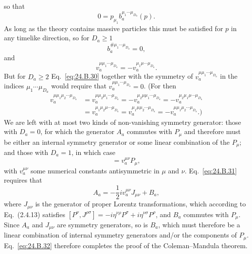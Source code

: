 so that
\begin{equation}
 0=p_{\mu_1}b_a^{\mu_1\cdots\mu_{D_a}}(p).
\tag{24.B.28}\label{eq:24.B.28}
\end{equation}
As long as the theory contains massive particles this must be satisfied for
$p$ in any timelike direction, so for $D_a\geq1$
\begin{equation}
 b_a^{\#\mu_1\cdots\mu_{D_a}}=0,
\tag{24.B.29}\label{eq:24.B.29}
\end{equation}
and
\begin{equation}
 v_a^{\mu\mu_1\cdots\mu_{D_a}}
 =-v_a^{\mu_1\mu\cdots\mu_{D_a}}.
\tag{24.B.30}\label{eq:24.B.30}
\end{equation}
But for $D_a\geq2$ Eq.~\eqref{eq:24.B.30} together with the symmetry of
$v_a^{\mu\mu_1\cdots\mu_{D_a}}$ in the indices
$\mu_1\cdots\mu_{D_a}$ would require that
$v_a^{\mu\mu_1\cdots\mu_{D_a}}=0$. (For then
\[
\begin{aligned}
 v_a^{\mu\mu_1\mu_2\cdots\mu_{D_a}}
 &=v_a^{\mu\mu_2\mu_1\cdots\mu_{D_a}}
 =-v_a^{\mu_2\mu\mu_1\cdots\mu_{D_a}}
 =-v_a^{\mu_2\mu_1\mu\cdots\mu_{D_a}}
 \\
 &=v_a^{\mu_1\mu_2\mu\cdots\mu_{D_a}}
 =v_a^{\mu_1\mu\mu_2\cdots\mu_{D_a}}
 =-v_a^{\mu\mu_1\mu_2\cdots\mu_{D_a}}\text{.)}
\end{aligned}
\]
We are left with at most two kinds of non-vanishing symmetry generator: those
with $D_a=0$, for which the generator $A_a$ commutes with $P_\mu$
and therefore must be either an internal symmetry generator or some linear
combination of the $P_\mu$; and those with $D_a=1$, in which case
\begin{equation}
 [P^\nu,A_a]=v_a^{\mu\nu}P_\mu,
\tag{24.B.31}\label{eq:24.B.31}
\end{equation}
with $v_a^{\mu\nu}$ some numerical constants antisymmetric in $\mu$ and
$\nu$. Eq.~\eqref{eq:24.B.31} requires that
\begin{equation}
 A_a=-\frac{1}{2}i v_a^{\mu\nu}J_{\mu\nu}+B_a,
\tag{24.B.32}\label{eq:24.B.32}
\end{equation}
\begingroup
\setlength{\emergencystretch}{10pt}
where $J_{\mu\nu}$ is the generator of proper Lorentz transformations, which
according to Eq.~(2.4.13) satisfies
$[P^\nu,J^{\rho\sigma}]
=-i\eta^{\nu\rho}P^\sigma\allowbreak
{}+i\eta^{\nu\sigma}P^\rho$, and $B_a$ commutes
with $P_\mu$. Since $A_a$ and $J_{\mu\nu}$ are symmetry generators, so is
$B_a$, which must therefore be a linear combination of internal symmetry
generators and/or the components of $P_\mu$. Eq.~\eqref{eq:24.B.32} therefore
completes the proof of the Coleman--Mandula theorem.
\par
\endgroup


